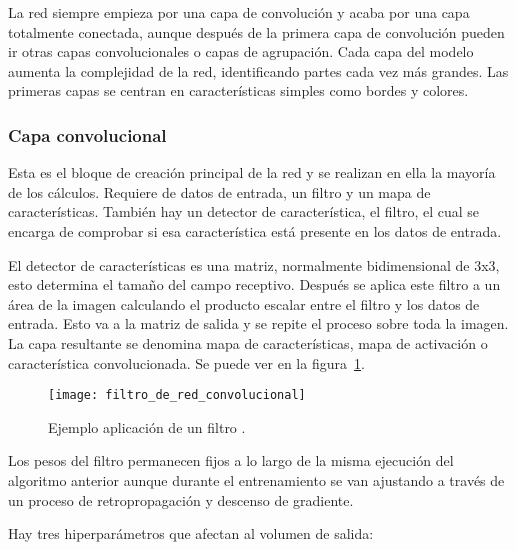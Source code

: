 La red siempre empieza por una capa de convolución y acaba por una capa totalmente conectada, aunque después de la primera capa de convolución pueden ir otras capas convolucionales o capas de agrupación. Cada capa del modelo aumenta la complejidad de la red, identificando partes cada vez más grandes. Las primeras capas se centran en características simples como bordes y colores. 

\subsubsection{Capa convolucional}
Esta es el bloque de creación principal de la red y se realizan en ella la mayoría de los cálculos. Requiere de datos de entrada, un filtro y un mapa de características. También hay un detector de característica, el filtro, el cual se encarga de comprobar si esa característica está presente en los datos de entrada.

El detector de características es una matriz, normalmente bidimensional de 3x3, esto determina el tamaño del campo receptivo. Después se aplica este filtro a un área de la imagen calculando el producto escalar entre el filtro y  los datos de entrada. Esto va a la matriz de salida y se repite el proceso sobre toda la imagen. La capa resultante se denomina mapa de características, mapa de activación o característica convolucionada. Se puede ver en la figura~\ref{fig:filtro}.

\begin{figure}[H]
	\centering
	\texttt{[image: filtro\_de\_red\_convolucional]}
	\caption[Ejemplo aplicación de un filtro.]{Ejemplo aplicación de un filtro \cite{cnn}.}
	\label{fig:filtro}
\end{figure}

Los pesos del filtro permanecen fijos a lo largo de la misma ejecución del algoritmo anterior aunque durante el entrenamiento se van ajustando a través de un proceso de retropropagación y descenso de gradiente.

Hay tres hiperparámetros que afectan al volumen de salida:

